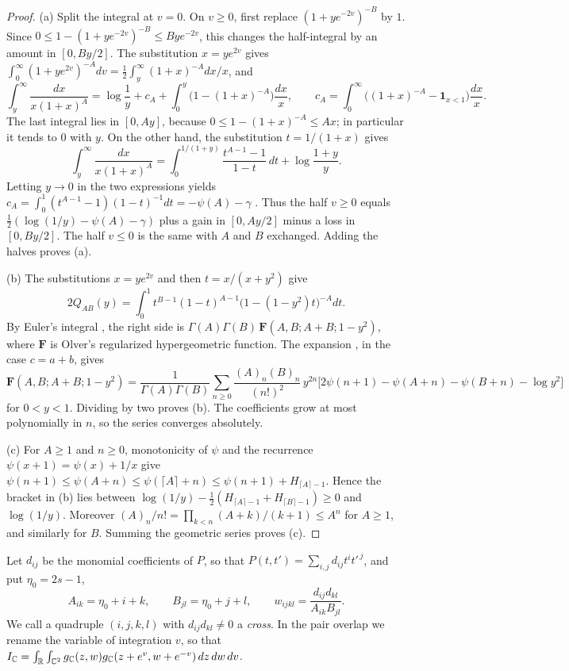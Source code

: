 \begin{proof}
(a) Split the integral at $v=0$. On $v\ge0$, first replace
$(1+ye^{-2v})^{-B}$ by $1$. Since
$0\le1-(1+ye^{-2v})^{-B}\le Bye^{-2v}$, this changes the half-integral
by an amount in $[0,By/2]$. The substitution $x=ye^{2v}$ gives
$\int_0^\infty(1+ye^{2v})^{-A}dv=\frac12\int_y^\infty(1+x)^{-A}dx/x$,
and
\[
 \int_y^\infty\frac{dx}{x(1+x)^A}
 =\log\frac1y+c_A+\int_0^y\bigl(1-(1+x)^{-A}\bigr)\frac{dx}x,\qquad
 c_A=\int_0^\infty\bigl((1+x)^{-A}-\mathbf 1_{x<1}\bigr)\frac{dx}x .
\]
The last integral lies in $[0,Ay]$, because $0\le1-(1+x)^{-A}\le Ax$;
in particular it tends to $0$ with $y$. On the other hand, the
substitution $t=1/(1+x)$ gives
\[
 \int_y^\infty\frac{dx}{x(1+x)^A}
 =\int_0^{1/(1+y)}\frac{t^{A-1}-1}{1-t}\,dt+\log\frac{1+y}y .
\]
Letting $y\to0$ in the two expressions yields
$c_A=\int_0^1(t^{A-1}-1)(1-t)^{-1}dt=-\psi(A)-\gamma$
\cite[Equation~(5.9.16)]{DLMF}. Thus the half $v\ge0$ equals
$\frac12(\log(1/y)-\psi(A)-\gamma)$ plus a gain in $[0,Ay/2]$ minus a
loss in $[0,By/2]$. The half $v\le0$ is the same with $A$ and $B$
exchanged. Adding the halves proves (a).

(b) The substitutions $x=ye^{2v}$ and then $t=x/(x+y^2)$ give
\[
 2Q_{AB}(y)=\int_0^1t^{B-1}(1-t)^{A-1}\bigl(1-(1-y^2)t\bigr)^{-A}dt .
\]
By Euler's integral \cite[Equation~(15.6.1)]{DLMF}, the right side is
$\Gamma(A)\Gamma(B)\,\mathbf F(A,B;A+B;1-y^2)$, where $\mathbf F$ is
Olver's regularized hypergeometric function. The expansion
\cite[Equation~(15.8.10)]{DLMF}, in the case $c=a+b$, gives
\[
 \mathbf F(A,B;A+B;1-y^2)=\frac1{\Gamma(A)\Gamma(B)}\sum_{n\ge0}
 \frac{(A)_n(B)_n}{(n!)^2}\,y^{2n}\bigl[2\psi(n+1)-\psi(A+n)-\psi(B+n)
 -\log y^2\bigr]
\]
for $0<y<1$. Dividing by two proves (b). The coefficients grow at most
polynomially in $n$, so the series converges absolutely.

(c) For $A\ge1$ and $n\ge0$, monotonicity of $\psi$ and the recurrence
$\psi(x+1)=\psi(x)+1/x$ give
$\psi(n+1)\le\psi(A+n)\le\psi(\lceil A\rceil+n)\le\psi(n+1)+H_{\lceil
A\rceil-1}$. Hence the bracket in (b) lies between
$\log(1/y)-\frac12(H_{\lceil A\rceil-1}+H_{\lceil B\rceil-1})\ge0$ and
$\log(1/y)$. Moreover $(A)_n/n!=\prod_{k<n}(A+k)/(k+1)\le A^n$ for
$A\ge1$, and similarly for $B$. Summing the geometric series proves
(c).
\end{proof}

Let $d_{ij}$ be the monomial coefficients of $P$, so that
$P(t,t')=\sum_{i,j}d_{ij}t^it'^{\,j}$, and put $\eta_0=2s-1$,
\[
 A_{ik}=\eta_0+i+k,\qquad B_{jl}=\eta_0+j+l,\qquad
 w_{ijkl}=\frac{d_{ij}d_{kl}}{A_{ik}B_{jl}} .
\]
We call a quadruple $(i,j,k,l)$ with $d_{ij}d_{kl}\ne0$ a \emph{cross}.
In the pair overlap we rename the variable of integration $v$, so that
$I_\mathbb C=\int_\mathbb R\int_{\mathbb C^2}g_\mathbb C(z,w)g_\mathbb C(z+e^v,w+e^{-v})\,dz\,dw\,dv$.

